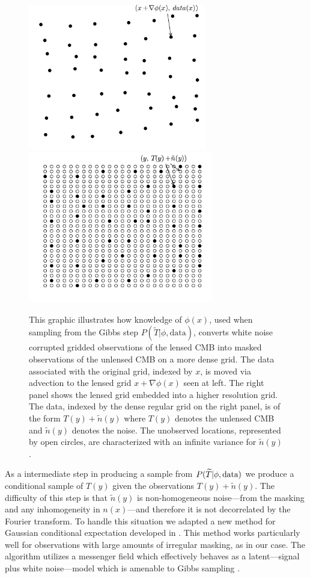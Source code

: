 \documentclass[iop,revtex4,apj,onecolumn]{emulateapj}
\begin{document}
\begin{figure}
\begin{center}
{\includegraphics[height=2.5in]{figure3a.pdf}}%
{\includegraphics[height=2.6in]{figure3b.pdf}}
\end{center}
 \caption{
\label{embed}
 This graphic illustrates how knowledge of $\phi(x)$, used when sampling from the Gibbs step $P(\widetilde T|\phi,\text{data})$, converts white noise corrupted gridded observations of the lensed CMB into masked observations of the unlensed CMB on a more dense grid.  The data associated with the original grid, indexed by $x$, is moved via advection to the lensed grid $x+\nabla \phi(x)$ seen at left. The right panel shows the lensed grid embedded into a higher resolution grid. The data, indexed by the dense regular grid on the right panel, is of the form $T(y)+\tilde n(y)$ where $T(y)$ denotes the unlensed CMB and $\tilde n(y)$ denotes the noise. The unobserved locations, represented by open circles, are characterized with an infinite variance for  $\tilde n(y)$. 
} 
\end{figure}


As a intermediate step in producing a sample from  $P(\widetilde T |  \phi,\text{\rm data})$ we produce a conditional  sample of $T(y)$ given the observations $T(y) + \tilde n(y)$. The difficulty of this step is that $\tilde n(y)$ is non-homogeneous noise---from the masking and any inhomogeneity in $n(x)$---and therefore it is not decorrelated by the Fourier transform. To handle this situation we adapted a new method for Gaussian conditional expectation developed in \cite{elsner2013efficient}. This method works particularly well for observations with large amounts of irregular masking, as in our case. The algorithm utilizes a messenger field which effectively behaves as a latent---signal plus white noise---model which is amenable to Gibbs sampling \citep{jasche2014matrix}.
\end{document}
